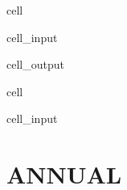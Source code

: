 \documentclass[letterpaper,10pt,english]{jupyterBook}
\begin{document}
\begin{sphinxuseclass}{cell}
\begin{sphinxVerbatimInput}
\begin{sphinxuseclass}{cell_input}
\end{sphinxuseclass}\end{sphinxVerbatimInput}
\begin{sphinxVerbatimOutput}

\begin{sphinxuseclass}{cell_output}
\noindent{}

\end{sphinxuseclass}\end{sphinxVerbatimOutput}

\end{sphinxuseclass}
\begin{sphinxuseclass}{cell}\begin{sphinxVerbatimInput}

\begin{sphinxuseclass}{cell_input}
\begin{sphinxVerbatim}[commandchars=\\\{\}]
  
\end{sphinxVerbatim}

\end{sphinxuseclass}\end{sphinxVerbatimInput}

\end{sphinxuseclass}
\sphinxstepscope


\part{ANNUAL}

\sphinxstepscope
\end{document}
